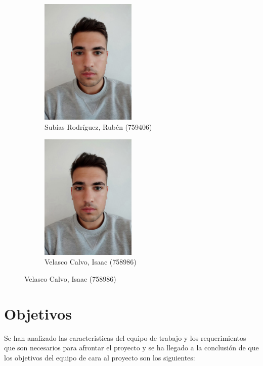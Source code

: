 \documentclass{article}
\begin{document}
\begin{figure}[H]
\begin{subfigure}[b]{0.49\textwidth}
        \includegraphics[width=0.5\textwidth]{../images/Andoni.jpeg}
        \caption*{Subías Rodríguez, Rubén (759406)}
     \end{subfigure}
     \hfill
     \begin{subfigure}[b]{0.49\textwidth}
        \centering
        \includegraphics[width=0.5\textwidth]{../images/Andoni.jpeg}
        \caption*{Velasco Calvo, Isaac (758986)}
     \end{subfigure}

    \end{figure}

\pagebreak
 
\section*{Objetivos}

Se han analizado las caracteristicas del equipo de trabajo y los requerimientos que son necesarios para afrontar el proyecto y se ha llegado a la conclusión de que los objetivos del equipo de cara al proyecto son los siguientes:
\end{document}
